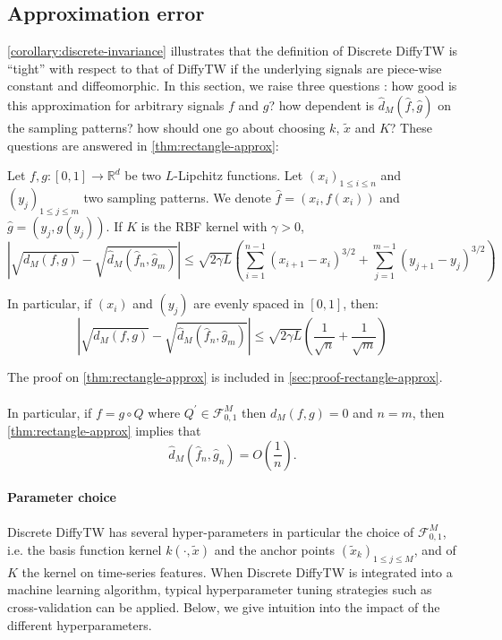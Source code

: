 \subsection{Approximation error}
\cref{corollary:discrete-invariance} illustrates that the definition of Discrete DiffyTW is ``tight'' with respect to that of DiffyTW if the underlying signals are piece-wise constant and diffeomorphic. In this section, we raise three questions : how good is this approximation for arbitrary signals $f$ and $g$? how dependent is $\hat d_M(\hat f, \hat g)$ on the sampling patterns? how should one go about choosing $k$, $\tilde x$ and $K$? These questions are answered in \cref{thm:rectangle-approx}:

\begin{theorem}\label{thm:rectangle-approx}
Let $f,g:[0,1] \to \mathbb R^d$ be two $L$-Lipchitz functions. Let $(x_i)_{1\leq i \leq n}$ and $(y_j)_{1\leq j\leq m}$ two sampling patterns. We denote $\hat f = (x_i, f(x_i))$ and $\hat g = (y_j, g(y_j))$.
If $K$ is the RBF kernel with $\gamma > 0$,
\begin{equation}
    \left\vert \sqrt{d_M(f, g)} - \sqrt{\hat d_M(\hat f_n, \hat g_m)}\right\vert \leq \sqrt{2\gamma L}\left(\sum_{i=1}^{n-1} (x_{i+1} - x_i)^{3/2} + \sum_{j=1}^{m-1} (y_{j+1} - y_j)^{3/2}\right)
\end{equation}

In particular, if $(x_i)$ and $(y_j)$ are evenly spaced in $[0,1]$, then:
\begin{equation}
    \left\vert \sqrt{d_M(f, g)} - \sqrt{\hat d_M(\hat f_n, \hat g_m)}\right\vert \leq \sqrt{2\gamma L}\left(\frac{1}{\sqrt{n}} + \frac{1}{\sqrt{m}}\right)
\end{equation}
\end{theorem}

The proof on \cref{thm:rectangle-approx} is included in \cref{sec:proof-rectangle-approx}.

\paragraph{}

In particular, if $f = g \circ Q$ where $Q^\prime \in\mathcal F_{0, 1}^M$ then $d_M(f, g)=0$ and $n=m$, then \cref{thm:rectangle-approx} implies that
\begin{equation}
\hat d_M(\hat f_n, \hat g_n) = O\left(\frac{1}{n}\right).
\end{equation}

\paragraph{Parameter choice}
Discrete DiffyTW has several hyper-parameters in particular the choice of $\mathcal F_{0,1}^M$, i.e. the basis function kernel $k(\cdot, \tilde x)$ and the anchor points $(\tilde x_k)_{1\leq j\leq M}$, and of $K$ the kernel on time-series features. When Discrete DiffyTW is integrated into a machine learning algorithm, typical hyperparameter tuning strategies such as cross-validation can be applied. Below, we give intuition into the impact of the different hyperparameters.

